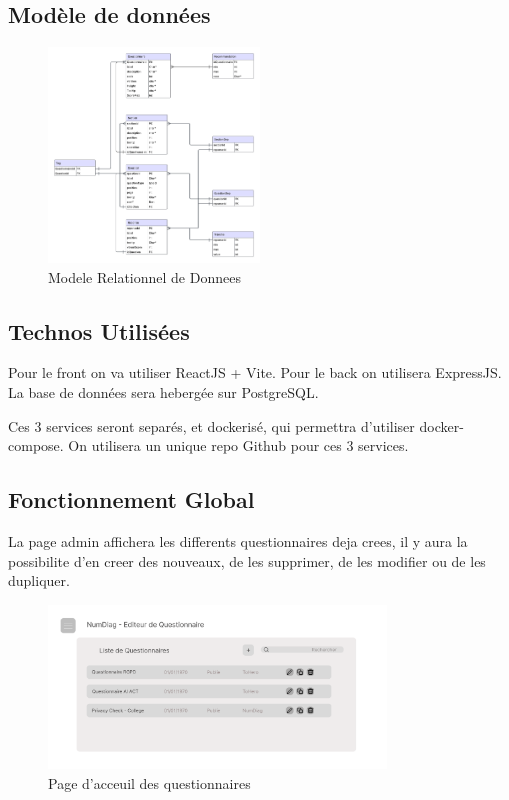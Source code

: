 \documentclass{extarticle}
\begin{document}
\subsection{Modèle de données}
\begin{figure}[h]
    \centering
    \includegraphics[width=0.5\textwidth]{NumdiagQuestionnaire.png}
    \caption{Modele Relationnel de Donnees}
    \label{fig:MRD}
\end{figure}

\subsection{Technos Utilisées}
Pour le front on va utiliser ReactJS + Vite.
Pour le back on utilisera ExpressJS. La base de données sera hebergée sur PostgreSQL.

Ces 3 services seront separés, et dockerisé, qui permettra d'utiliser docker-compose. 
On utilisera un unique repo Github pour ces 3 services.

\subsection{Fonctionnement Global}
La page admin affichera les differents questionnaires deja crees, il y aura la possibilite d'en creer des nouveaux, de les supprimer, de les modifier ou de les dupliquer.

\begin{figure}[h]
    \centering
    \includegraphics[width=0.8\textwidth]{adminVue.png}
    \caption{Page d'acceuil des questionnaires}
    \label{fig:AdminQuestionnaire}
\end{figure}
\end{document}
